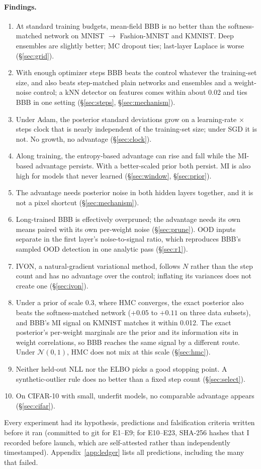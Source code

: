 \documentclass[11pt]{article}
\begin{document}
\paragraph{Findings.}
\begin{enumerate}
\item At standard training budgets, mean-field BBB is no better than the
softness-matched network on MNIST $\to$ Fashion-MNIST and KMNIST. Deep
ensembles are slightly better; MC dropout ties; last-layer Laplace is worse
(\S\ref{sec:grid}).
\item With enough optimizer steps BBB beats the control whatever the
training-set size, and also beats step-matched plain networks and ensembles
and a weight-noise control; a kNN detector on features comes within about
0.02 and ties BBB in one setting
(\S\ref{sec:steps}, \S\ref{sec:mechanism}).
\item Under Adam, the posterior standard deviations grow on a learning-rate
$\times$ steps clock that is nearly independent of the training-set size; under
SGD it is not. No growth, no advantage (\S\ref{sec:clock}).
\item Along training, the entropy-based advantage can rise and fall while the
MI-based advantage persists. With a better-scaled prior both persist. MI is
also high for models that never learned (\S\ref{sec:window},
\S\ref{sec:prior}).
\item The advantage needs posterior noise in both hidden layers together, and
it is not a pixel shortcut (\S\ref{sec:mechanism}).
\item Long-trained BBB is effectively overpruned; the advantage needs its own
means paired with its own per-weight noise (\S\ref{sec:prune}). OOD inputs
separate in the first layer's noise-to-signal ratio, which reproduces BBB's
sampled OOD detection in one analytic pass (\S\ref{sec:r1}).
\item IVON, a natural-gradient variational method, follows $N$ rather than
the step count and has no advantage over the control; inflating its
variances does not create one (\S\ref{sec:ivon}).
\item Under a prior of scale 0.3, where HMC converges, the exact posterior
also beats the softness-matched network ($+0.05$ to $+0.11$ on three data
subsets), and BBB's MI signal on KMNIST matches it within 0.012. The exact posterior's per-weight
marginals are the prior and its information sits in weight correlations, so BBB
reaches the same signal by a different route. Under $\mathcal N(0,1)$, HMC does
not mix at this scale (\S\ref{sec:hmc}).
\item Neither held-out NLL nor the ELBO picks a good stopping point. A
synthetic-outlier rule does no better than a fixed step count
(\S\ref{sec:select}).
\item On CIFAR-10 with small, underfit models, no comparable advantage
appears (\S\ref{sec:cifar}).
\end{enumerate}
Every experiment had its hypothesis, predictions and falsification criteria
written before it ran (committed to git for E1--E9; for E10--E23, SHA-256
hashes that I recorded before launch, which are self-attested rather than
independently timestamped). Appendix~\ref{app:ledger} lists all
predictions, including the many that failed.
\end{document}
